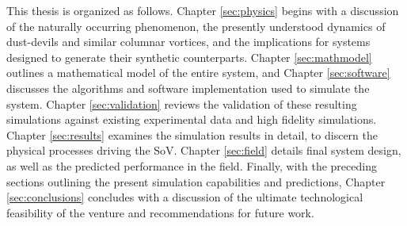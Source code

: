 This thesis is organized as follows. Chapter \ref{sec:physics} begins
with a discussion of the naturally occurring phenomenon, the presently
understood dynamics of dust-devils and similar columnar vortices, and
the implications for systems designed to generate their synthetic
counterparts.  
Chapter \ref{sec:mathmodel} outlines a mathematical model of
the entire system, and Chapter \ref{sec:software} discusses the
algorithms and software implementation used to simulate the
system. Chapter \ref{sec:validation} reviews the validation of
these resulting simulations against existing experimental data and high 
fidelity simulations.  
Chapter \ref{sec:results} examines the simulation results in detail, to
discern the physical processes driving the SoV. Chapter \ref{sec:field}
details final system design, as well as the predicted performance in the
field.  
%
%
%
Finally, with the preceding sections outlining the present simulation
capabilities and predictions, Chapter \ref{sec:conclusions} concludes
with a discussion of the ultimate technological feasibility of the
venture and recommendations for future work. 

%
